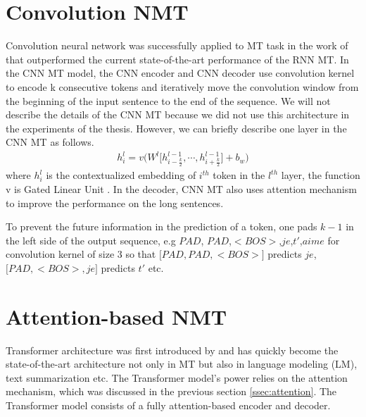 \section{Convolution NMT} \label{sec:cnn}
Convolution neural network was successfully applied to MT task in the work of \cite{Ghering17convolutional} that outperformed the current state-of-the-art performance of the RNN MT. In the CNN MT model, the CNN encoder and CNN decoder use convolution kernel to encode k consecutive tokens and iteratively move the convolution window from the beginning of the input sentence to the end of the sequence. We will not describe the details of the CNN MT because we did not use this architecture in the experiments of the thesis. However, we can briefly describe one layer in the CNN MT as follows.
\begin{equation}
\begin{array}{lcr}
h^l_i = v\bigg( W^l \big[h^{l-1}_{i-\frac{k}{2}}, \cdots, h^{l-1}_{i+\frac{k}{2}} \big] + b_w \bigg)
\end{array}
\end{equation}
where $h^l_i$ is the contextualized embedding of $i^{th}$ token in the $l^{th}$ layer, the function v is Gated Linear Unit \citep{Ghering17convolutional}. In the decoder, CNN MT also uses attention mechanism to improve the performance on the long sentences. 

To prevent the future information in the prediction of a token, one
pads $k-1$ in the left side of the output sequence, e.g $PAD$, $PAD$,$ <BOS>$,$je$,$t'$,$aime$ for convolution kernel of size 3 so that $\big[ PAD, PAD, <BOS>\big]$ predicts $je$, $\big[ PAD,<BOS>,je\big]$ predicts $t'$ etc.

\section{Attention-based NMT} \label{sec:transformer}
Transformer architecture was first introduced by \cite{Vaswani17attention} and has quickly become the state-of-the-art architecture not only in MT but also in language modeling (LM)\cite{Devlin19bert,Brown20language,Conneau19cross}, text summarization \cite{Zhang20pegasus} etc. The Transformer model's power relies on the attention mechanism, which was discussed in the previous section \ref{ssec:attention}. The Transformer model consists of a fully attention-based encoder and decoder. 
